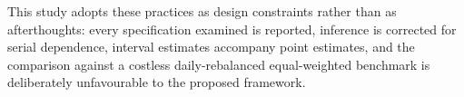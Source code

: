 This study adopts these practices as design constraints rather than as afterthoughts:
every specification examined is reported, inference is corrected for serial dependence,
interval estimates accompany point estimates, and the comparison against a costless
daily-rebalanced equal-weighted benchmark is deliberately unfavourable to the proposed
framework.
